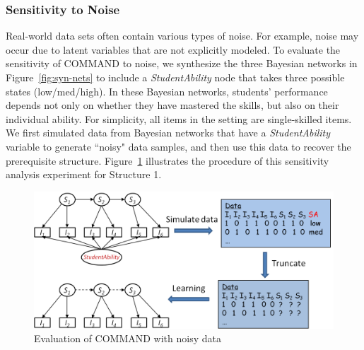 \documentclass{edm_template}
\newcommand{\hl}[1]{\colorbox{yellow}{#1}}
\begin{document}
	
	\subsubsection{Sensitivity to Noise}	
	
	Real-world data sets often contain various types of noise.
	For example,  noise may occur due to latent variables that are not explicitly modeled. 
	To evaluate the sensitivity of COMMAND to noise, we synthesize the three Bayesian networks in Figure~\ref{fig:syn-nets} to include a \emph{StudentAbility} node 
	that takes three possible states (low/med/high). 
	In these Bayesian networks, students' performance depends not only on whether they have mastered the skills, but also on their individual ability. %
	For simplicity, all items in the setting are single-skilled items. 
	We first simulated data from  Bayesian networks that have a \emph{StudentAbility} variable to generate ``noisy" data samples, and 
	then use this data to recover the prerequisite structure. %
	Figure~\ref{fig:stuabilitymodel} illustrates the procedure of this sensitivity analysis experiment for Structure 1.
	
			\begin{figure}[!ht]
				\begin{center}
					\includegraphics[width=.95\linewidth]{figures/studentability.png}
				\end{center}
				\caption{Evaluation of COMMAND with noisy data} 
				\label{fig:stuabilitymodel}
			\end{figure}
			
\end{document}
